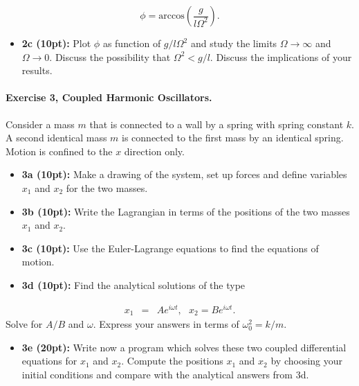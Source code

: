 \documentclass[%
oneside,                 %
final,                   %
10pt]{article}
\begin{document}
\noindent
\[
\phi=\mathrm{arccos}\left(\frac{g}{l\Omega^2}\right).
\]

\begin{itemize}
\item \textbf{2c (10pt):} Plot $\phi$ as function of $g/l\Omega^2$ and study the limits $\Omega\rightarrow \infty$ and $\Omega\rightarrow 0$. Discuss  the possibility that $\Omega^2 < g/l$. Discuss the implications of your results. 
\end{itemize}

\noindent
\paragraph{Exercise 3, Coupled Harmonic Oscillators.}
Consider a mass $m$ that is connected to a wall by a spring with
spring constant $k$. A second identical mass $m$ is connected to the
first mass by an identical spring. Motion is confined to the $x$ direction only.

\begin{itemize}
\item \textbf{3a (10pt):} Make a drawing of the system, set up forces and define variables $x_1$ and $x_2$ for the two masses.

\item \textbf{3b (10pt):} Write the Lagrangian in terms of the positions of the two masses $x_1$ and $x_2$.

\item \textbf{3c (10pt):} Use the Euler-Lagrange equations to find the  equations of motion.

\item \textbf{3d (10pt):} Find the analytical  solutions of the type
\end{itemize}

\noindent
\begin{eqnarray*}
x_1&=&Ae^{i\omega t},~~~x_2=Be^{i\omega t}.
\end{eqnarray*}
Solve for $A/B$ and $\omega$. Express your answers in terms of $\omega_0^2=k/m$.

\begin{itemize}
\item \textbf{3e (20pt):} Write now a program which solves these two coupled differential equations for $x_1$ and $x_2$. Compute the positions $x_1$ and $x_2$ by choosing your initial conditions and compare with the analytical answers from 3d.   
\end{itemize}

\noindent


\end{document}
